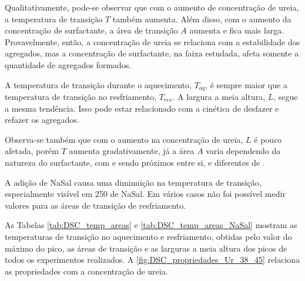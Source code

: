 	Qualitativamente, pode-se observar que com o aumento de concentração de ureia, a temperatura de transição \(T\) também aumenta. Além disso, com o aumento da concentração de surfactante, a área de transição \(A\) aumenta e fica mais larga. Provavelmente, então, a concentração de ureia se relaciona com a estabilidade dos agregados, mas a concentração de surfactante, na faixa estudada, afeta somente a quantidade de agregados formados. 
	
	A temperatura de transição durante o aquecimento, \(T_{aq}\), é sempre maior que a temperatura de transição no resfriamento, \(T_{res}\). A largura a meia altura, \(L\), segue a mesma tendência. Isso pode estar relacionado com a cinética de desfazer e refazer os agregados. 
	
	Observa-se também que com o aumento na concentração de ureia, \(L\) é pouco afetada, porém \(T\) aumenta gradativamente, já a área \(A\) varia dependendo da natureza do surfactante, com \CTAB{} e \TTAB{} sendo próximos entre si, e diferentes de \DTAB.
	
	A adição de NaSal causa uma diminuição na temperatura de transição, especialmente visível em 250 \mM{} de NaSal. Em vários casos não foi possível medir valores para as áreas de transição de resfriamento.
	
	As Tabelas \ref{tab:DSC_temp_areas} e \ref{tab:DSC_temp_areas_NaSal} mostram as temperaturas de transição no aquecimento e resfriamento, obtidas pelo valor do máximo do pico, as áreas de transição e as larguras a meia altura dos picos de todos os experimentos realizados. A \autoref{fig:DSC_propriedades_Ur_38_45} relaciona as propriedades com a concentração de ureia. %
	
